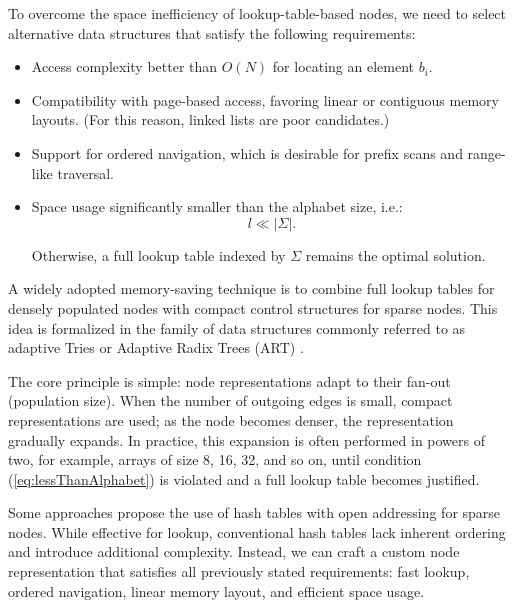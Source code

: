 \documentclass[11pt,twoside]{article}
\begin{document}
    To overcome the space inefficiency of lookup-table-based nodes, we
    need to select alternative data structures that satisfy the following
    requirements:

    \begin{itemize}
        \item
        Access complexity better than \(O(N)\) for locating an element
        \(b_{i}\).
        \item
        Compatibility with page-based access, favoring linear or contiguous
        memory layouts. (For this reason, linked lists are poor candidates.)
        \item
        Support for ordered navigation, which is desirable for prefix scans
        and range-like traversal.
        \item
        Space usage significantly smaller than the alphabet size, i.e.:
        \begin{equation}
            l \ll |\Sigma|.\label{eq:lessThanAlphabet}
        \end{equation}

        Otherwise, a full lookup table indexed by \(\Sigma\) remains the optimal solution.

    \end{itemize}

    A widely adopted memory-saving technique is to combine full lookup
    tables for densely populated nodes with compact control structures for
    sparse nodes. This idea is formalized in the family of data structures
    commonly referred to as adaptive Tries or Adaptive Radix Trees
    (ART) \cite{leis2013adaptive}.

    The core principle is simple: node representations adapt to their
    fan-out (population size). When the number of outgoing edges is small,
    compact representations are used; as the node becomes denser, the
    representation gradually expands. In practice, this expansion is often
    performed in powers of two, for example, arrays of size 8, 16, 32, and
    so on, until condition (\ref{eq:lessThanAlphabet}) is violated and a full lookup table becomes
    justified.

    Some approaches \cite{farachcolton2025optimalboundsopenaddressing} propose the use of hash tables with open
    addressing for sparse nodes. While effective for lookup, conventional hash tables
    lack inherent ordering and introduce additional complexity. Instead, we
    can craft a custom node representation that satisfies all previously
    stated requirements: fast lookup, ordered navigation, linear memory
    layout, and efficient space usage.
\end{document}

